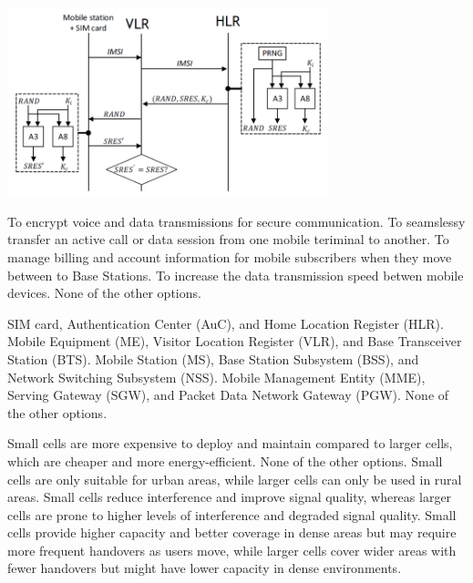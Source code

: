 \begin{solution}
    \center
    \includegraphics[width=0.7\textwidth]{images/GSM_auth.png}
\end{solution}






\begin{checkboxes}
    \choice To encrypt voice and data transmissions for secure communication.
    \choice To seamslessy transfer an active call or data session from one mobile teriminal to another.
    \choice To manage billing and account information for mobile subscribers when they move between to Base Stations.
    \choice To increase the data transmission speed betwen mobile devices.
    \CorrectChoice None of the other options.
\end{checkboxes}

\begin{checkboxes}
    \CorrectChoice SIM card, Authentication Center (AuC), and Home Location Register (HLR).
    \choice Mobile Equipment (ME), Visitor Location Register (VLR), and Base Transceiver Station (BTS).
    \choice Mobile Station (MS), Base Station Subsystem (BSS), and Network Switching Subsystem (NSS).
    \choice Mobile Management Entity (MME), Serving Gateway (SGW), and Packet Data Network Gateway (PGW).
    \choice None of the other options.
\end{checkboxes}

\begin{checkboxes}
    \choice Small cells are more expensive to deploy and maintain compared to larger cells, which are cheaper and more energy-efficient.
    \choice None of the other options.
    \choice Small cells are only suitable for urban areas, while larger cells can only be used in rural areas.
    \choice Small cells reduce interference and improve signal quality, whereas larger cells are prone to higher levels of interference and degraded signal quality.
    \CorrectChoice Small cells provide higher capacity and better coverage in dense areas but may require more frequent handovers as users move, while larger cells cover wider areas with fewer handovers but might have lower capacity in dense environments.
\end{checkboxes}

